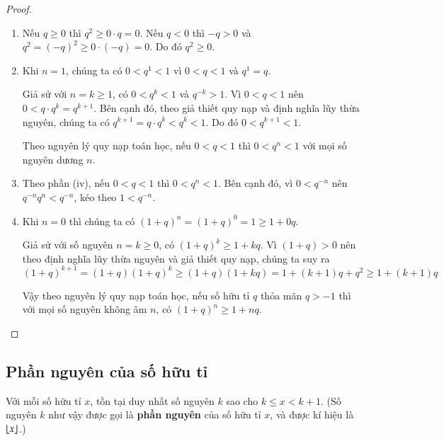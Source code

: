 \begin{proof}
    \begin{enumerate}[label={(\roman*)}]
        \item Nếu $q\geq 0$ thì $q^{2}\geq 0\cdot q = 0$. Nếu $q < 0$ thì $-q > 0$ và $q^{2} = {(-q)}^{2}\geq 0\cdot (-q) = 0$. Do đó $q^{2}\geq 0$.
        \item Khi $n = 1$, chúng ta có $0 < q^{1} < 1$ vì $0 < q < 1$ và $q^{1} = q$.

              Giả sử với $n = k\geq 1$, có $0 < q^{k} < 1$ và $q^{-k} > 1$. Vì $0 < q < 1$ nên $0 < q\cdot q^{k} = q^{k+1}$. Bên cạnh đó, theo giả thiết quy nạp và định nghĩa lũy thừa nguyên, chúng ta có $q^{k+1} = q\cdot q^{k} < q^{k} < 1$. Do đó $0 < q^{k+1} < 1$.

              Theo nguyên lý quy nạp toán học, nếu $0 < q < 1$ thì $0 < q^{n} < 1$ với mọi số nguyên dương $n$.
        \item Theo phần (iv), nếu $0 < q < 1$ thì $0 < q^{n} < 1$. Bên cạnh đó, vì $0 < q^{-n}$ nên $q^{-n}q^{n} < q^{-n}$, kéo theo $1 < q^{-n}$.
        \item Khi $n = 0$ thì chúng ta có ${(1 + q)}^{n} = {(1 + q)}^{0} = 1 \geq 1 + 0q$.

              Giả sử với số nguyên $n = k\geq 0$, có ${(1 + q)}^{k} \geq 1 + kq$. Vì $(1 + q) > 0$ nên theo định nghĩa lũy thừa nguyên và  giả thiết quy nạp, chúng ta suy ra
              \[
                  {(1 + q)}^{k+1} = (1 + q){(1 + q)}^{k} \geq (1 + q)(1 + kq) = 1 + (k+1)q + q^{2} \geq 1 + (k + 1)q
              \]

              Vậy theo nguyên lý quy nạp toán học, nếu số hữu tỉ $q$ thỏa mãn $q > -1$ thì với mọi số nguyên không âm $n$, có ${(1 + q)}^{n}\geq 1 + nq$.
    \end{enumerate}
\end{proof}

\subsection{Phần nguyên của số hữu tỉ}

\begin{theorem}
    Với mỗi số hữu tỉ $x$, tồn tại duy nhất số nguyên $k$ sao cho $k\leq x < k+1$. (Số nguyên $k$ như vậy được gọi là \textbf{phần nguyên} của số hữu tỉ $x$, và được kí hiệu là $\left\lfloor{x}\right\rfloor$.)
\end{theorem}


